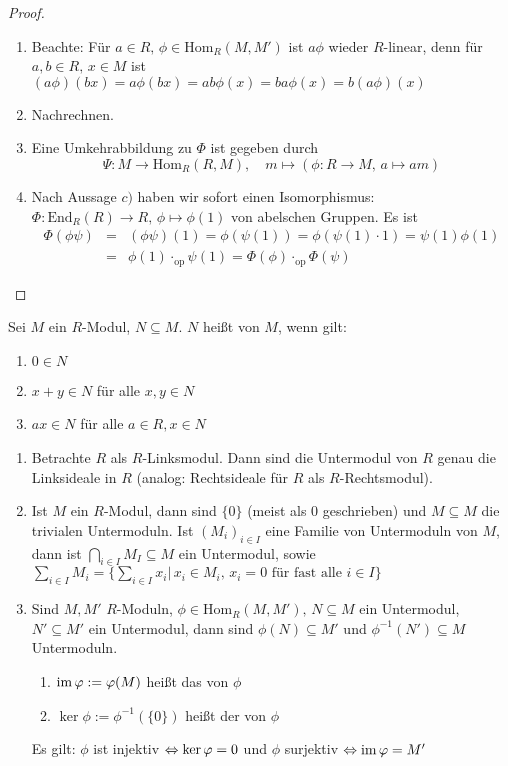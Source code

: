 \begin{proof}
	\begin{enumerate}[label=\alph*)]
		\item Beachte: Für $a\in R, \, \phi\in \text{Hom}_R(M, M')$ ist $a\phi$ wieder $R$-linear, denn für $a,b\in R, \, x\in M$ ist $(a\phi)(bx) = a\phi(bx) = ab \phi(x) = ba \phi(x) = b (a\phi)(x)$
		\item Nachrechnen.
		\item Eine Umkehrabbildung zu $\Phi$ ist gegeben durch 
		$$\Psi:M \to \text{Hom}_R(R, M), \quad m \mapsto(\phi:R\to M, \, a \mapsto am)$$
		\item Nach Aussage $c)$ haben wir sofort einen Isomorphismus: $\Phi:\text{End}_R(R) \to R, \, \phi\mapsto \phi(1)$ von abelschen Gruppen. Es ist 
		\begin{eqnarray*}\Phi(\phi \psi) &=& (\phi \psi)(1) = \phi(\psi(1)) = \phi( \psi(1) \cdot 1) = \psi(1) \phi(1)\\
		&=& \phi(1) \cdot_{\text{op}}  \psi(1) = \Phi(\phi) \cdot_\text{op} \Phi(\psi)
		\end{eqnarray*}
	\end{enumerate}
\end{proof}
\begin{df}\label{1.7}
	Sei $M$ ein $R$-Modul, $N\subseteq M$. $N$ heißt  von $M$, wenn gilt:
	\begin{enumerate}[label= \alph*)]
		\item $0\in N$
		\item $x+y\in N$ für alle $x,y\in N$
		\item $ax\in N$ für alle $a\in R, x\in N$
	\end{enumerate}
\end{df}
\begin{bsp}
	\begin{enumerate}[label=\alph*)]
		\item Betrachte $R$ als $R$-Linksmodul. Dann sind die Untermodul von $R$ genau die Linksideale in $R$ (analog: Rechtsideale für $R$ als $R$-Rechtsmodul).
		\item Ist $M$ ein $R$-Modul, dann sind $\{0\}$ (meist als $0$ geschrieben) und $M\subseteq M$ die trivialen Untermoduln. Ist $(M_i)_{i\in I}$ eine Familie von Untermoduln von $M$, dann ist $\bigcap_{i\in I} M_I\subseteq M$ ein Untermodul, sowie $\sum_{i\in I} M_i = \{\sum_{i\in I} x_i|\, x_i \in M_i, \, x_i=0 \text{ für fast alle } i\in I\}$
		\item Sind $M, M'$ $R$-Moduln, $\phi\in \text{Hom}_R(M, M'), \, N\subseteq M$ ein Untermodul, $N' \subseteq M'$ ein Untermodul, dann sind $\phi(N) \subseteq M'$ und $\phi^{-1}(N') \subseteq M$ Untermoduln. 
		\begin{enumerate}
			\item[] $\operatorname{im} \varphi:= \varphi(M)$ heißt das  von $\phi$
			\item[] $\ker \phi:= \phi^{-1}(\{0\})$ heißt der  von $\phi$
		\end{enumerate}
	Es gilt: $\phi$ ist injektiv $\Leftrightarrow \ker \varphi =0$ und $\phi$ surjektiv $\Leftrightarrow \operatorname{im} \varphi = M'$
	\end{enumerate}
\end{bsp}
